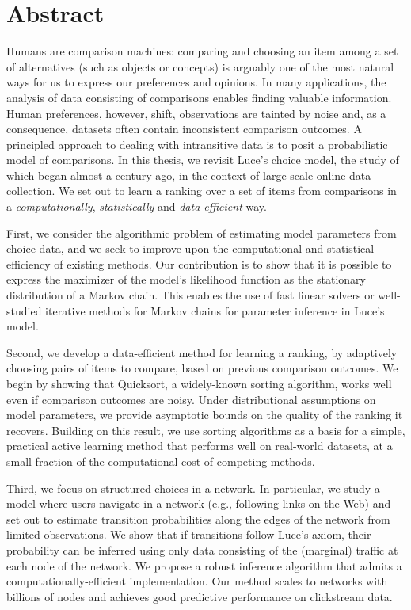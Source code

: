 \cleardoublepage
\chapter*{Abstract}

Humans are comparison machines: comparing and choosing an item among a set of alternatives (such as objects or concepts) is arguably one of the most natural ways for us to express our preferences and opinions.
In many applications, the analysis of data consisting of comparisons enables finding valuable information.
Human preferences, however, shift, observations are tainted by noise and, as a consequence, datasets often contain inconsistent comparison outcomes.
A principled approach to dealing with intransitive data is to posit a probabilistic model of comparisons.
In this thesis, we revisit Luce's choice model, the study of which began almost a century ago, in the context of large-scale online data collection.
We set out to learn a ranking over a set of items from comparisons in a \emph{computationally}, \emph{statistically} and \emph{data efficient} way.

First, we consider the algorithmic problem of estimating model parameters from choice data, and we seek to improve upon the computational and statistical efficiency of existing methods.
Our contribution is to show that it is possible to express the maximizer of the model's likelihood function as the stationary distribution of a Markov chain.
This enables the use of fast linear solvers or well-studied iterative methods for Markov chains for parameter inference in Luce's model.

Second, we develop a data-efficient method for learning a ranking, by adaptively choosing pairs of items to compare, based on previous comparison outcomes.
We begin by showing that Quicksort, a widely-known sorting algorithm, works well even if comparison outcomes are noisy.
Under distributional assumptions on model parameters, we provide asymptotic bounds on the quality of the ranking it recovers.
Building on this result, we use sorting algorithms as a basis for a simple, practical active learning method that performs well on real-world datasets, at a small fraction of the computational cost of competing methods.

Third, we focus on structured choices in a network.
In particular, we study a model where users navigate in a network (e.g., following links on the Web) and set out to estimate transition probabilities along the edges of the network from limited observations.
We show that if transitions follow Luce's axiom, their probability can be inferred using only data consisting of the (marginal) traffic at each node of the network.
We propose a robust inference algorithm that admits a computationally-efficient implementation.
Our method scales to networks with billions of nodes and achieves good predictive performance on clickstream data.


